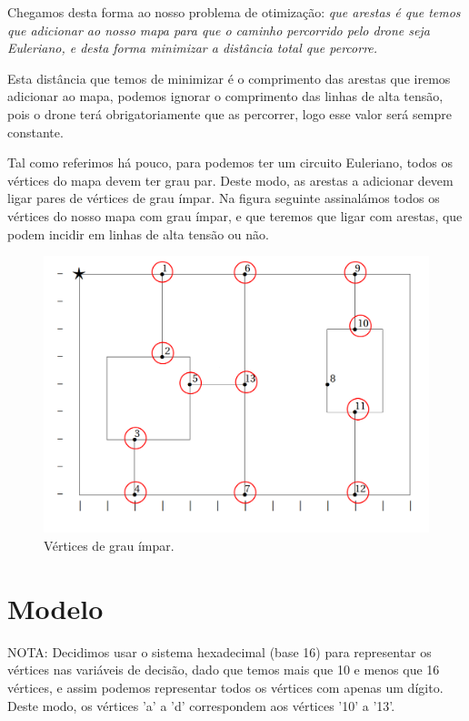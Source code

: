 \documentclass{article}
\begin{document}
Chegamos desta forma ao nosso problema de otimização: \emph{que arestas é que temos que adicionar ao nosso mapa para que o caminho percorrido pelo drone seja Euleriano, e desta forma minimizar a distância total que percorre.}

Esta distância que temos de minimizar é o comprimento das arestas que iremos adicionar ao mapa, podemos ignorar o comprimento das linhas de alta tensão, pois o drone terá obrigatoriamente que as percorrer, logo esse valor será sempre constante.

Tal como referimos há pouco, para podemos ter um circuito Euleriano, todos os vértices do mapa devem ter grau par. Deste modo, as arestas a adicionar devem ligar pares de vértices de grau ímpar. Na figura seguinte assinalámos todos os vértices do nosso mapa com grau ímpar, e que teremos que ligar com arestas, que podem incidir em linhas de alta tensão ou não.

\begin{figure}[h]
    \includegraphics[width=\linewidth]{fig2.png}
    \caption{Vértices de grau ímpar.}
    \label{verticesimpares}
\end{figure}

\section{Modelo}

NOTA: Decidimos usar o sistema hexadecimal (base 16) para representar os vértices nas variáveis de decisão, dado que temos mais que 10 e menos que 16 vértices, e assim podemos representar todos os vértices com apenas um dígito. Deste modo, os vértices 'a' a 'd' correspondem aos vértices '10' a '13'.
\end{document}
